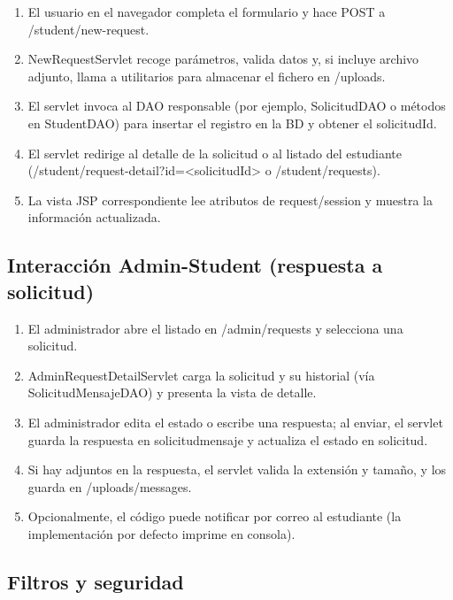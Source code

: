 \documentclass[12pt,letterpaper]{article}
\newcommand{\code}[1]{\texorpdfstring{\begingroup\normalfont\normalsize\def\_{\textunderscore\allowbreak}#1\endgroup}{#1}}
\begin{document}
\begin{enumerate}
    \item El usuario en el navegador completa el formulario y hace POST a \code{/student/new-request}.
    \item \code{NewRequestServlet} recoge parámetros, valida datos y, si incluye archivo adjunto, llama a utilitarios para almacenar el fichero en \code{/uploads}.
    \item El servlet invoca al DAO responsable (por ejemplo, \code{SolicitudDAO} o métodos en \code{StudentDAO}) para insertar el registro en la BD y obtener el \code{solicitudId}.
    \item El servlet redirige al detalle de la solicitud o al listado del estudiante (\code{/student/request-detail?id=<solicitudId>} o \code{/student/requests}).
    \item La vista JSP correspondiente lee atributos de request/session y muestra la información actualizada.
\end{enumerate}

\subsection{Interacción Admin-Student (respuesta a solicitud)}

\begin{enumerate}
    \item El administrador abre el listado en \code{/admin/requests} y selecciona una solicitud.
    \item \code{AdminRequestDetailServlet} carga la solicitud y su historial (vía \code{SolicitudMensajeDAO}) y presenta la vista de detalle.
    \item El administrador edita el estado o escribe una respuesta; al enviar, el servlet guarda la respuesta en \code{solicitud\_mensaje} y actualiza el estado en \code{solicitud}.
    \item Si hay adjuntos en la respuesta, el servlet valida la extensión y tamaño, y los guarda en \code{/uploads/messages}.
    \item Opcionalmente, el código puede notificar por correo al estudiante (la implementación por defecto imprime en consola).
\end{enumerate}

\subsection{Filtros y seguridad}
\end{document}
